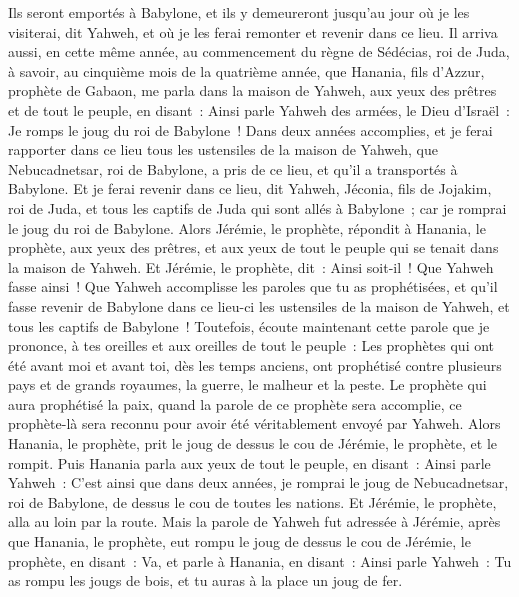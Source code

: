 \begin{multicols}{2}
Ils seront emportés à Babylone, et ils y demeureront jusqu'au jour où je les visiterai, dit Yahweh, et où je les ferai remonter et revenir dans ce lieu.
\VerseOne{}Il arriva aussi, en cette même année, au commencement du règne de Sédécias, roi de Juda, à savoir, au cinquième mois de la quatrième année, que Hanania, fils d'Azzur, prophète de Gabaon, me parla dans la maison de Yahweh, aux yeux des prêtres et de tout le peuple, en disant~:
Ainsi parle Yahweh des armées, le Dieu d'Israël~: Je romps le joug du roi de Babylone~!
Dans deux années accomplies, et je ferai rapporter dans ce lieu tous les ustensiles de la maison de Yahweh, que Nebucadnetsar, roi de Babylone, a pris de ce lieu, et qu'il a transportés à Babylone.
Et je ferai revenir dans ce lieu, dit Yahweh, Jéconia, fils de Jojakim, roi de Juda, et tous les captifs de Juda qui sont allés à Babylone~; car je romprai le joug du roi de Babylone.
Alors Jérémie, le prophète, répondit à Hanania, le prophète, aux yeux des prêtres, et aux yeux de tout le peuple qui se tenait dans la maison de Yahweh.
Et Jérémie, le prophète, dit~: Ainsi soit-il~! Que Yahweh fasse ainsi~! Que Yahweh accomplisse les paroles que tu as prophétisées, et qu'il fasse revenir de Babylone dans ce lieu-ci les ustensiles de la maison de Yahweh, et tous les captifs de Babylone~!
Toutefois, écoute maintenant cette parole que je prononce, à tes oreilles et aux oreilles de tout le peuple~:
Les prophètes qui ont été avant moi et avant toi, dès les temps anciens, ont prophétisé contre plusieurs pays et de grands royaumes, la guerre, le malheur et la peste.
Le prophète qui aura prophétisé la paix, quand la parole de ce prophète sera accomplie, ce prophète-là sera reconnu pour avoir été véritablement envoyé par Yahweh.
Alors Hanania, le prophète, prit le joug de dessus le cou de Jérémie, le prophète, et le rompit.
Puis Hanania parla aux yeux de tout le peuple, en disant~: Ainsi parle Yahweh~: C'est ainsi que dans deux années, je romprai le joug de Nebucadnetsar, roi de Babylone, de dessus le cou de toutes les nations. Et Jérémie, le prophète, alla au loin par la route.
Mais la parole de Yahweh fut adressée à Jérémie, après que Hanania, le prophète, eut rompu le joug de dessus le cou de Jérémie, le prophète, en disant~:
Va, et parle à Hanania, en disant~: Ainsi parle Yahweh~: Tu as rompu les jougs de bois, et tu auras à la place un joug de fer.

\end{multicols}
